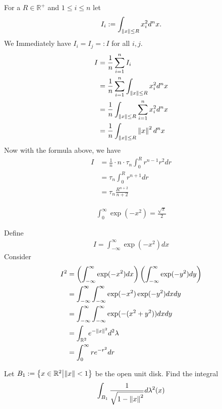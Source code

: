 \begin{example}
    For a \(R \in \mathbb{R}^+\) and \(1 \leq i \leq n\) let 
    \begin{align}
        I_i := \int_{\left\lVert x\right\rVert \leq R} x_i^2 d^nx \text{.}
    \end{align}
    We Immediately have \(I_i = I_j =: I\) for all \(i, j\).
    \begin{align}
        I &= \frac{1}{n} \sum_{i = 1}^n I_i\\
        &= \frac{1}{n} \sum_{i = 1}^n \int_{\left\lVert x\right\rVert \leq R} x_i^2 d^n x\\
        &= \frac{1}{n} \int_{\left\lVert x\right\rVert \leq R} \sum_{i = 1}^n x_i^2 d^n x\\
        &= \frac{1}{n} \int_{\left\lVert x\right\rVert \leq R} \left\lVert x\right\rVert^2 d^n x \\
    \end{align}
    Now with the formula above, we have
    \begin{align}
        I &= \frac{1}{n} \cdot n \cdot \tau_n \int_0^R r^{n-1} r^2 dr\\
        &= \tau_n \int_0^R r^{n+1} dr \\
        &=\tau_n \frac{R^{n+2}}{n+2}
    \end{align}
\end{example}
\begin{example}
    \begin{align}
        \int_0^\infty \exp(-x^2) = \frac{\sqrt{\pi}}{2}
    \end{align}
\end{example}
\proof
Define
\begin{align}
    I = \int_{-\infty}^\infty \exp(-x^2) dx
\end{align}
Consider
\begin{align}
    I^2 &= \left( \int_{-\infty}^\infty \exp(-x^2) dx \right) \left( \int_{-\infty}^\infty \exp(-y^2) dy \right) \\
    &= \int_{-\infty}^{\infty} \int_{-\infty}^{\infty} \exp(-x^2) \exp(-y^2) dx dy \\
    &= \int_{-\infty}^\infty \int_{-\infty}^\infty \exp(-(x^2 + y^2)) dx dy \\
    &= \int_{\mathbb{R}^2} e^{-\left\lVert x\right\rVert^2} d^2\lambda \\
    &= \int_0^\infty r e^{-r^2} dr
\end{align}
%
%
%
%
%
\begin{example}
    Let \(B_1 := \left\{ x \in \mathbb{R}^2 \middle| \left\lVert x\right\rVert < 1 \right\}\) be the open unit disk. Find the integral
    \begin{align}
        \int_{B_1} \frac{1}{\sqrt{1 - \left\lVert x\right\rVert^2}} d\lambda^2(x)
    \end{align}
\end{example}
